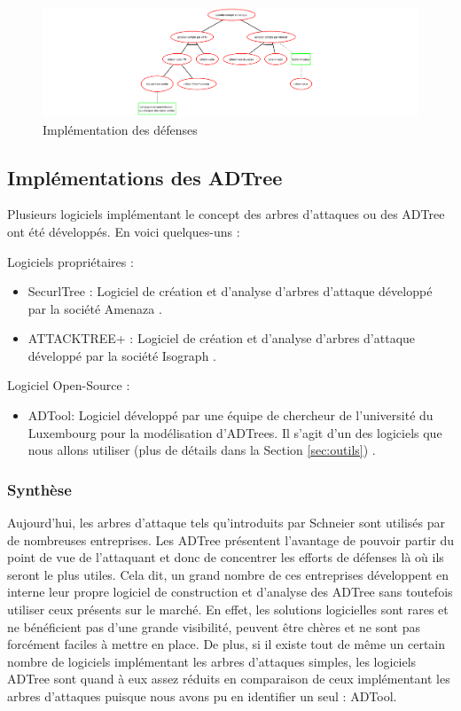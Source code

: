         \begin{figure}[htbp]
        \centering
        \includegraphics[width=\textwidth]{figure/exemple2_rapport.pdf}%
        \caption{Implémentation des défenses}
        \label{fig:arbre_exemple_3}
        \end{figure}

	\subsection{Implémentations des ADTree}
		Plusieurs logiciels implémentant le concept des arbres d'attaques ou des ADTree ont été développés. En voici quelques-uns :
        
        Logiciels propriétaires :
        \begin{itemize}
        \item SecurlTree : Logiciel de création et d'analyse d'arbres d'attaque développé par la société Amenaza \cite{SecurlTree}.
        \item ATTACKTREE+ : Logiciel de création et d'analyse d'arbres d'attaque développé par la société Isograph \cite{ATTACKTREE+}.
        \end{itemize}
        
        Logiciel Open-Source :
        \begin{itemize}
        \item ADTool: Logiciel développé par une équipe de chercheur de l'université du Luxembourg pour la modélisation d'ADTrees. Il s'agit d'un des logiciels que nous allons utiliser (plus de détails dans la Section \ref{sec:outils}) \cite{ADTool}.
        \end{itemize}

        \subsubsection{Synthèse}
            Aujourd'hui, les arbres d'attaque tels qu'introduits par Schneier sont utilisés par de nombreuses entreprises. Les ADTree présentent l'avantage de pouvoir partir du point de vue de l'attaquant et donc de concentrer les efforts de défenses là où ils seront le plus utiles. Cela dit, un grand nombre de ces entreprises développent en interne leur propre logiciel de construction et d'analyse des ADTree sans toutefois utiliser ceux présents sur le marché. En effet, les solutions logicielles sont rares et ne bénéficient pas d'une grande visibilité, peuvent être chères et ne sont pas forcément faciles à mettre en place. De plus, si il existe tout de même un certain nombre de logiciels implémentant les arbres d'attaques simples, les logiciels ADTree sont quand à eux assez réduits en comparaison de ceux implémentant les arbres d'attaques puisque nous avons pu en identifier un seul : ADTool. 

